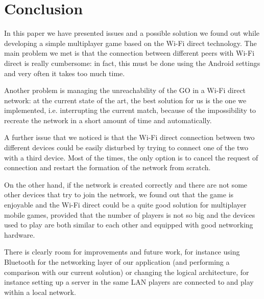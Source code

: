 \section{Conclusion}
In this paper we have presented issues and a possible solution we
found out while developing a simple multiplayer game based on the Wi-Fi direct
technology. The main problem we met is that the connection between
different peers with Wi-Fi direct is really cumbersome: in fact, this must be
done using the Android settings and very often it takes too much time.

Another problem is managing the unreachability of the GO in a Wi-Fi direct
network: at the current state of the art, the best solution for us is the one
we implemented, i.e. interrupting the current match, because of the
impossibility to recreate the network in a short amount of time and
automatically.

A further issue that we noticed is that the Wi-Fi direct connection
between two different devices could be easily disturbed by trying to connect
one of the two with a third device. Most of the times, the only option is to
cancel the request of connection and restart the formation of the network from
scratch.

On the other hand, if the network is created correctly and there are not
some other devices that try to join the network, we found out that the game
is enjoyable and the Wi-Fi direct could be a quite good solution for
multiplayer mobile games, provided that the number of players is not so big and
the devices used to play are both similar to each other and equipped with good
networking hardware.

There is clearly room for improvements and future work, for instance
using Bluetooth for the networking layer of our application (and performing a
comparison with our current solution) or changing the logical architecture, for
instance setting up a server in the same LAN players are connected to and
play within a local network.